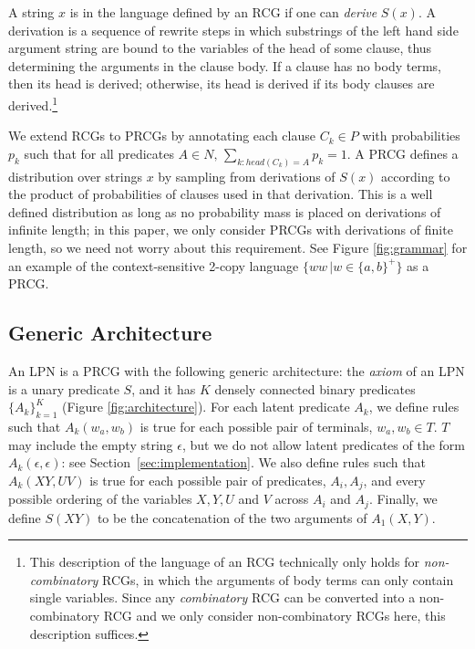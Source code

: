 \documentclass[10pt, twocolumn]{article}
\begin{document}
A string $x$ is in the language defined by an RCG if one can
\emph{derive} $S(x)$. A derivation is a sequence of rewrite steps in
which substrings of the left hand side argument string are bound to
the variables of the head of some clause, thus determining the
arguments in the clause body. If a clause has no body terms, then its
head is derived; otherwise, its head is derived if its body clauses
are derived.\footnote{This description of the language of an RCG
  technically only holds for \emph{non-combinatory} RCGs, in which the
  arguments of body terms can only contain single variables. Since any
  \emph{combinatory} RCG can be converted into a non-combinatory RCG
  and we only consider non-combinatory RCGs here, this description
  suffices.}

We extend RCGs to PRCGs by annotating each clause $C_k \in P$ with
probabilities $p_k$ such that for all predicates ${A \in N, \,
  \sum_{k:head(C_k)=A} p_k = 1}$. A PRCG defines a distribution over
strings $x$ by sampling from derivations of $S(x)$ according to the
product of probabilities of clauses used in that derivation. This is a
well defined distribution as long as no probability mass is placed on
derivations of infinite length; in this paper, we only consider PRCGs
with derivations of finite length, so we need not worry about this
requirement. See Figure \ref{fig:grammar} for an example of the context-sensitive 2-copy language $\{ww\,|w \in \{a,b\}^+\}$ as a PRCG.

\subsection{Generic Architecture}

An LPN is a PRCG with the following generic architecture: the
\emph{axiom} of an LPN is a unary predicate $S$, and it has $K$
densely connected binary predicates $\{A_k\}_{k=1}^K$ (Figure
\ref{fig:architecture}). For each latent predicate $A_k$, we define
rules such that $A_k(w_a,w_b)$ is true for each possible pair of
terminals, $w_a,w_b \in T$. $T$ may include the empty string $\epsilon$, but we
do not allow latent predicates of the form $A_k(\epsilon, \epsilon)$:
see Section~\ref{sec:implementation}. We also define rules such that
$A_k(XY,UV)$ is true for each possible pair of predicates, $A_i,A_j$,
and every possible ordering of the variables $X,Y,U$ and $V$ across
$A_i$ and $A_j$. Finally, we define $S(XY)$ to be the concatenation of
the two arguments of $A_1(X,Y)$.
 
\end{document}
